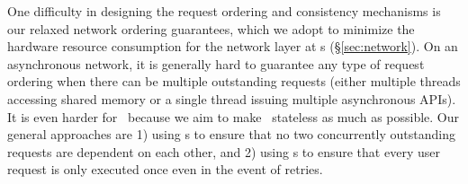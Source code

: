 One difficulty in designing the request ordering and consistency mechanisms is our relaxed network ordering guarantees, 
which we adopt to minimize the hardware resource consumption for the network layer at \MN{}s (\S\ref{sec:network}).
On an asynchronous network, it is generally hard to guarantee any type of request ordering when there can be multiple outstanding requests (either multiple threads accessing shared memory or a single thread issuing multiple asynchronous APIs). It is even harder for \sys\ because we aim to make \MN\ stateless as much as possible.
Our general approaches are 1) using \CN{}s to ensure that no two concurrently outstanding requests are dependent on each other, and 2) using \MN{}s to ensure that every user request is only executed once even in the event of retries.




